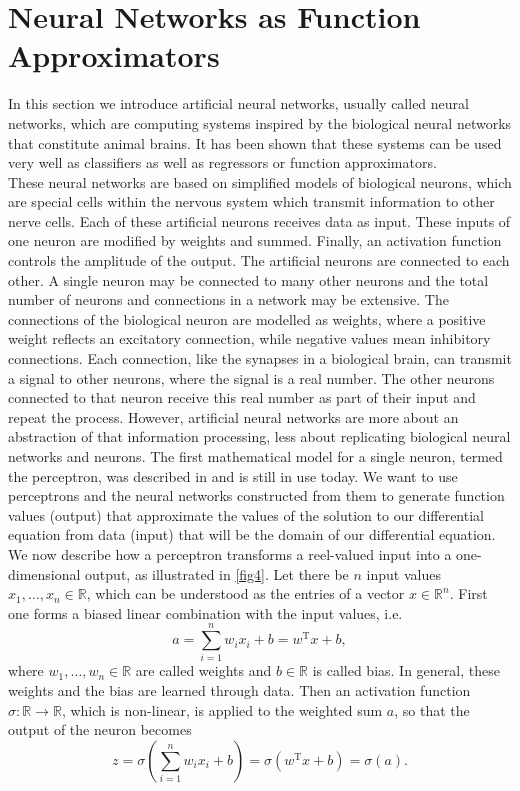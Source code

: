 \section{Neural Networks as Function Approximators}
\label{ch1:sec3}

In this section we introduce artificial neural networks, usually called neural networks, which are computing systems inspired by the biological neural networks that constitute animal brains. It has been shown that these systems can be used very well as classifiers as well as regressors or function approximators. \\
These neural networks are based on simplified models of biological neurons, which are special cells within the nervous system which transmit information to other nerve cells. Each of these artificial neurons receives data as input. These inputs of one neuron are modified by weights and summed. Finally, an activation function controls the amplitude of the output. The artificial neurons are connected to each other. A single neuron may be connected to many other neurons and the total number of neurons and connections in a network may be extensive. The connections of the biological neuron are modelled as weights, where a positive weight reflects an excitatory connection, while negative values mean inhibitory connections. Each connection, like the synapses in a biological brain, can transmit a signal to other neurons, where the signal is a real number. The other neurons connected to that neuron receive this real number as part of their input and repeat the process. However, artificial neural networks are more about an abstraction of that information processing, less about replicating biological neural networks and neurons. The first mathematical model for a single neuron, termed the perceptron, was described in \cite{Rosenblatt:1958} and is still in use today. We want to use perceptrons and the neural networks constructed from them to generate function values (output) that approximate the values of the solution to our differential equation from data (input) that will be the domain of our differential equation. \\
We now describe how a perceptron transforms a reel-valued input into a one-dimensional output, as illustrated in \cref{fig4}. Let there be $n$ input values $x_1, \ldots, x_n \in \mathbb{R}$, which can be understood as the entries of a vector $x \in \mathbb{R}^n$. First one forms a biased linear combination with the input values, i.e. 
\begin{equation*}
    a = \sum^{n}_{i=1} w_i x_i + b = w^{\mathrm{T}} x + b,
\end{equation*}
where $w_1, \ldots, w_n \in \mathbb{R}$ are called weights and $b \in \mathbb{R}$ is called bias. In general, these weights and the bias are learned through data. Then an activation function $\sigma \colon \mathbb{R} \to \mathbb{R}$, which is non-linear, is applied to the weighted sum $a$, so that the output of the neuron becomes
\begin{equation*}
    z = \sigma(\sum^{n}_{i=1} w_i x_i + b) = \sigma(w^{\mathrm{T}} x + b) = \sigma(a).
\end{equation*}

